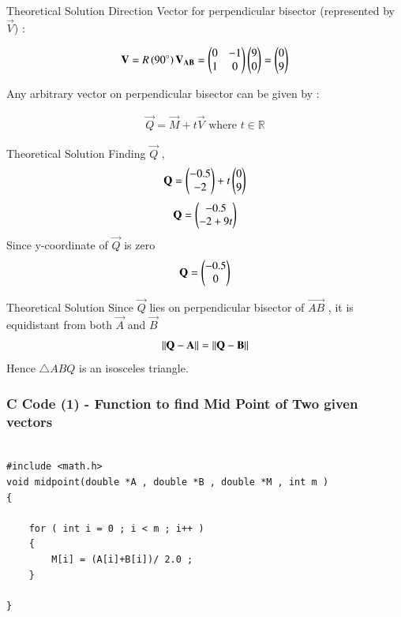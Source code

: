 \documentclass{beamer}
\begin{document}
\begin{frame}{Theoretical Solution}
Direction Vector for perpendicular bisector (represented by $\vec{V}$) : 

\begin{align}
    \mathbf{V} = R\left(90 \degree \right) \mathbf{V_{AB}} = \begin{pmatrix}0 & -1 \\ 1 & 0\end{pmatrix}\begin{pmatrix}9 \\ 0\end{pmatrix} = \begin{pmatrix}0 \\ 9 \end{pmatrix}
\end{align}

Any arbitrary vector on perpendicular bisector can be given by : 

\begin{align}
    \vec{Q} = \vec{M} + t\vec{V} \text{ where } t \in \mathbb{R}
\end{align}

\end{frame}

\begin{frame}{Theoretical Solution}
Finding $\vec{Q}$ , 
\begin{align}
    \mathbf{Q} = \begin{pmatrix}-0.5 \\ -2 \end{pmatrix} + t\begin{pmatrix}0 \\ 9\end{pmatrix} 
\end{align}
\begin{align}
    \mathbf{Q} = \begin{pmatrix}-0.5 \\ -2 + 9t\end{pmatrix}
\end{align}
Since y-coordinate of $\vec{Q}$ is zero 
\begin{align}
    \mathbf{Q} = \begin{pmatrix}-0.5 \\ 0 \end{pmatrix}
\end{align}   

\end{frame}

\begin{frame}{Theoretical Solution}
Since $\vec{Q}$ lies on perpendicular bisector of $\vec{AB}$ , it is equidistant from both $\vec{A}$ and $\vec{B}$
\begin{align}
    \left\lVert\mathbf{Q} - \mathbf{A}\right\rVert = \left\lVert\mathbf{Q} - \mathbf{B}\right\rVert
\end{align}
Hence $\triangle ABQ$ is an isosceles triangle.


\end{frame}

\begin{frame}[fragile]
    \frametitle{C Code (1) - Function to find Mid Point of Two given vectors }

    \begin{lstlisting}
    
#include <math.h>
void midpoint(double *A , double *B , double *M , int m )
{
    
    for ( int i = 0 ; i < m ; i++ )
    {
        M[i] = (A[i]+B[i])/ 2.0 ;
    }
    
}
    \end{lstlisting}
\end{frame}
\end{document}
